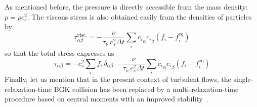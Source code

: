 \documentclass{jfm}
\begin{document}
As mentioned before, the pressure is directly accessible from the mass density: $p = \rho c_s^2$. The viscous stress is also obtained easily from the densities of particles by
\[
\tau^\mathrm{visc.}_{\alpha \beta} = -\frac{\nu}{\tau_\nu ~ c_s^2 \Delta t} \sum_i  {c_i}_\alpha {c_i}_\beta (f_i - f_i^\mathrm{eq})
\]
so that the total stress expresses as
\begin{equation}\label{eq:def_stress}
\tau_{\alpha \beta} = -  c_s^2 \sum_i f_i ~ \delta_{\alpha\beta}  - \frac{\nu}{\tau_\nu ~ c_s^2 \Delta t} \sum_i  {c_i}_\alpha {c_i}_\beta (f_i - f_i^\mathrm{eq})
\end{equation}
Finally, let us mention that in the present context of turbulent flows, the single-relaxation-time BGK collision has been replaced by a multi-relaxation-time procedure based on central moments with an improved stability~\citep{De_Rosis_2016}.



\end{document}
